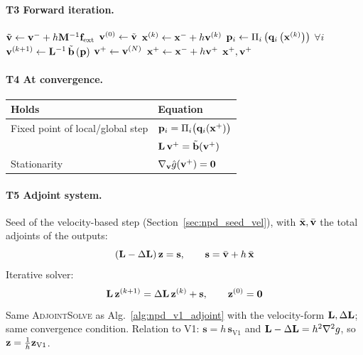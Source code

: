 \paragraph{T3 Forward iteration.}\mbox{}
\begin{algorithm}[H]
\caption{V1$'$: one PD step (\textsc{Forward} as in Alg.~\ref{alg:npd_v1}).}
\label{alg:npd_v1p}
\begin{algorithmic}[1]
    \State $\tilde{\mathbf{v}} \gets \mathbf{v}^- + h\mathbf{M}^{-1}\mathbf{f}_{\text{ext}}$
    \State $\mathbf{v}^{(0)} \gets \tilde{\mathbf{v}}$
        \State $\mathbf{x}^{(k)} \gets \mathbf{x}^- + h\mathbf{v}^{(k)}$
        \State $\mathbf{p}_i \gets \Pi_i\left(\mathbf{q}_i\left(\mathbf{x}^{(k)}\right)\right)$ \quad $\forall i$ 
        \State $\mathbf{v}^{(k+1)} \gets \mathbf{L}^{-1}\,\tilde{\mathbf{b}}\left(\mathbf{p}\right)$ 
    \EndFor
    \State $\mathbf{v}^+ \gets \mathbf{v}^{(N)}$
    \State $\mathbf{x}^+ \gets \mathbf{x}^- + h\mathbf{v}^+$
    \State \Return $\mathbf{x}^+, \mathbf{v}^+$
\EndFunction
\end{algorithmic}
\end{algorithm}
\paragraph{T4 At convergence.}\mbox{}
\begin{center}
\renewcommand{\arraystretch}{1.6}
\begin{tabular}{ll}
\textbf{Holds} & \textbf{Equation} \\ \hline
Fixed point of local/global step & $\mathbf{p}_i = \Pi_i\big(\mathbf{q}_i(\mathbf{x}^+)\big)$ \\ & $\mathbf{L}\,\mathbf{v}^+ = \tilde{\mathbf{b}}(\mathbf{v}^+)$ \\
Stationarity & $\nabla_{\mathbf{v}}\hat g(\mathbf{v}^+) = \mathbf{0}$
\end{tabular}
\end{center}
\paragraph{T5 Adjoint system.}\mbox{}
\newline Seed of the velocity-based step (Section~\ref{sec:npd_seed_vel}), with $\bar{\mathbf{x}}, \bar{\mathbf{v}}$ the total adjoints of the outputs:
\begin{equation*}
    \left(\mathbf{L} - \Delta\mathbf{L}\right)\mathbf{z} = \mathbf{s},
    \qquad
    \mathbf{s} = \bar{\mathbf{v}} + h\,\bar{\mathbf{x}}
\end{equation*}
Iterative solver:
\begin{equation*}
    \mathbf{L}\,\mathbf{z}^{(k+1)} = \Delta\mathbf{L}\,\mathbf{z}^{(k)} + \mathbf{s},
    \qquad
    \mathbf{z}^{(0)} = \mathbf{0}
\end{equation*}
\noindent Same \textsc{AdjointSolve} as Alg.~\ref{alg:npd_v1_adjoint} with the velocity-form $\mathbf{L}, \Delta\mathbf{L}$; same convergence condition. Relation to V1: $\mathbf{s} = h\,\mathbf{s}_{\text{V1}}$ and $\mathbf{L} - \Delta\mathbf{L} = h^2\nabla^2 g$, so $\mathbf{z} = \tfrac{1}{h}\mathbf{z}_{\text{V1}}$.

